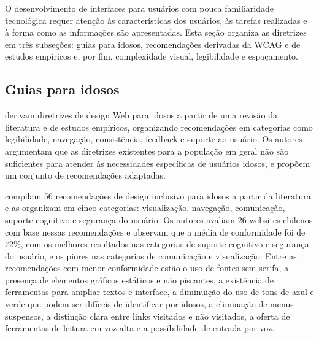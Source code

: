 \label{sec:diretrizes}

O desenvolvimento de interfaces para usuários com pouca familiaridade tecnológica requer atenção às características dos usuários, às tarefas realizadas e à forma como as informações são apresentadas. Esta seção organiza as diretrizes em três subseções: guias para idosos, recomendações derivadas da WCAG e de estudos empíricos e, por fim, complexidade visual, legibilidade e espaçamento.

\subsection{Guias para idosos}

\label{sec:guias_idosos}

\cite{kurniawan2005research} derivam diretrizes de design Web para idosos a partir de uma revisão da literatura e de estudos empíricos, organizando recomendações em categorias como legibilidade, navegação, consistência, feedback e suporte ao usuário. Os autores argumentam que as diretrizes existentes para a população em geral não são suficientes para atender às necessidades específicas de usuários idosos, e propõem um conjunto de recomendações adaptadas.

\cite{dombrovskaia2021guideline} compilam 56 recomendações de design inclusivo para idosos a partir da literatura e as organizam em cinco categorias: visualização, navegação, comunicação, suporte cognitivo e segurança do usuário. Os autores avaliam 26 websites chilenos com base nessas recomendações e observam que a média de conformidade foi de 72\%, com os melhores resultados nas categorias de suporte cognitivo e segurança do usuário, e os piores nas categorias de comunicação e visualização. Entre as recomendações com menor conformidade estão o uso de fontes sem serifa, a presença de elementos gráficos estáticos e não piscantes, a existência de ferramentas para ampliar textos e interface, a diminuição do uso de tons de azul e verde que podem ser difíceis de identificar por idosos, a eliminação de menus suspensos, a distinção clara entre links visitados e não visitados, a oferta de ferramentas de leitura em voz alta e a possibilidade de entrada por voz.

